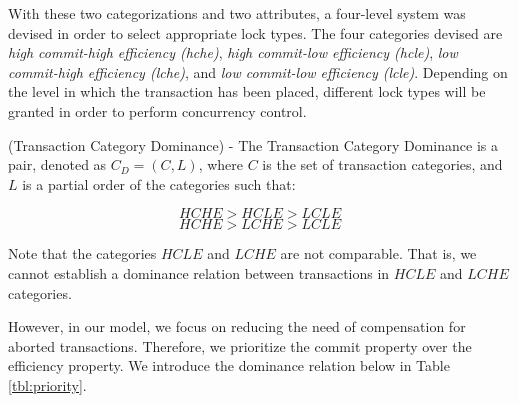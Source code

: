\begin{definition}
{With these two categorizations and two attributes, a four-level system was devised in order to select appropriate lock types. The four categories devised are \textit{high commit-high efficiency (\gls{hche})}, \textit{high commit-low efficiency (\gls{hcle})}, \textit{low commit-high efficiency (\gls{lche})}, and \textit{low commit-low efficiency (\gls{lcle})}. Depending on the level in which the transaction has been placed, different lock types will be granted in order to perform concurrency control.}

\end{definition}

\begin{definition}
\label{cat_dominance}
(Transaction Category Dominance) - The Transaction Category Dominance is a pair, denoted as $C_{D} = (C,L)$, where $C$ is the set of transaction categories, and $L$ is a partial order of the categories such that:
 
\[\textrm{$HCHE > HCLE > LCLE$}\]
\[\textrm{$HCHE > LCHE > LCLE$} \]

\begin{figure}[h]
\captionsetup{justification=centering}
\centering %


\label{fig:category_lattice} %

\end{figure}

{\normalfont Note that the categories $HCLE$ and $LCHE$ are not comparable. That is, we cannot establish a dominance relation between transactions in $HCLE$ and $LCHE$ categories.

However, in our model, we focus on reducing the need of compensation for aborted transactions. Therefore, we prioritize the commit property over the efficiency property. We introduce the dominance relation below in Table \ref{tbl:priority}.}


\end{definition}
